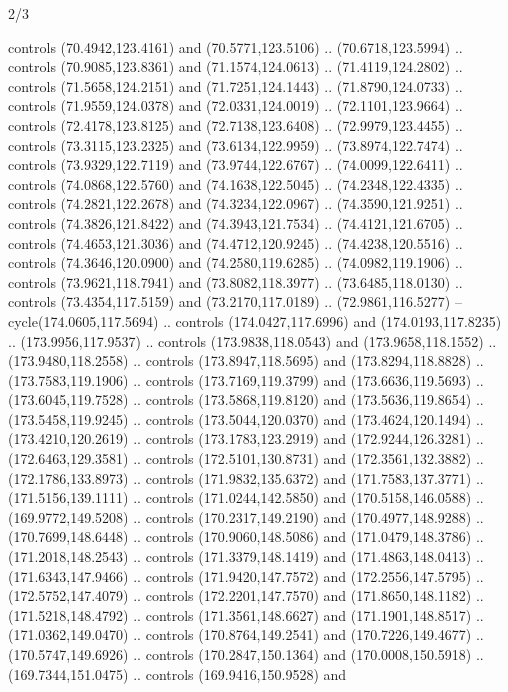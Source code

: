 \begin{flagdescription}{2/3}
\begin{scope}[shift={(0.5\flaglength,0.5)},scale=\flagwidth/320]
\begin{scope}[y=0.8pt, x=0.8pt, yscale=-1,shift={(-118.3,-146)}]
  controls (70.4942,123.4161) and (70.5771,123.5106) .. (70.6718,123.5994) ..
  controls (70.9085,123.8361) and (71.1574,124.0613) .. (71.4119,124.2802) ..
  controls (71.5658,124.2151) and (71.7251,124.1443) .. (71.8790,124.0733) ..
  controls (71.9559,124.0378) and (72.0331,124.0019) .. (72.1101,123.9664) ..
  controls (72.4178,123.8125) and (72.7138,123.6408) .. (72.9979,123.4455) ..
  controls (73.3115,123.2325) and (73.6134,122.9959) .. (73.8974,122.7474) ..
  controls (73.9329,122.7119) and (73.9744,122.6767) .. (74.0099,122.6411) ..
  controls (74.0868,122.5760) and (74.1638,122.5045) .. (74.2348,122.4335) ..
  controls (74.2821,122.2678) and (74.3234,122.0967) .. (74.3590,121.9251) ..
  controls (74.3826,121.8422) and (74.3943,121.7534) .. (74.4121,121.6705) ..
  controls (74.4653,121.3036) and (74.4712,120.9245) .. (74.4238,120.5516) ..
  controls (74.3646,120.0900) and (74.2580,119.6285) .. (74.0982,119.1906) ..
  controls (73.9621,118.7941) and (73.8082,118.3977) .. (73.6485,118.0130) ..
  controls (73.4354,117.5159) and (73.2170,117.0189) .. (72.9861,116.5277) --
  cycle(174.0605,117.5694) .. controls (174.0427,117.6996) and
  (174.0193,117.8235) .. (173.9956,117.9537) .. controls (173.9838,118.0543) and
  (173.9658,118.1552) .. (173.9480,118.2558) .. controls (173.8947,118.5695) and
  (173.8294,118.8828) .. (173.7583,119.1906) .. controls (173.7169,119.3799) and
  (173.6636,119.5693) .. (173.6045,119.7528) .. controls (173.5868,119.8120) and
  (173.5636,119.8654) .. (173.5458,119.9245) .. controls (173.5044,120.0370) and
  (173.4624,120.1494) .. (173.4210,120.2619) .. controls (173.1783,123.2919) and
  (172.9244,126.3281) .. (172.6463,129.3581) .. controls (172.5101,130.8731) and
  (172.3561,132.3882) .. (172.1786,133.8973) .. controls (171.9832,135.6372) and
  (171.7583,137.3771) .. (171.5156,139.1111) .. controls (171.0244,142.5850) and
  (170.5158,146.0588) .. (169.9772,149.5208) .. controls (170.2317,149.2190) and
  (170.4977,148.9288) .. (170.7699,148.6448) .. controls (170.9060,148.5086) and
  (171.0479,148.3786) .. (171.2018,148.2543) .. controls (171.3379,148.1419) and
  (171.4863,148.0413) .. (171.6343,147.9466) .. controls (171.9420,147.7572) and
  (172.2556,147.5795) .. (172.5752,147.4079) .. controls (172.2201,147.7570) and
  (171.8650,148.1182) .. (171.5218,148.4792) .. controls (171.3561,148.6627) and
  (171.1901,148.8517) .. (171.0362,149.0470) .. controls (170.8764,149.2541) and
  (170.7226,149.4677) .. (170.5747,149.6926) .. controls (170.2847,150.1364) and
  (170.0008,150.5918) .. (169.7344,151.0475) .. controls (169.9416,150.9528) and

\end{scope}
\end{scope}
\end{flagdescription}
